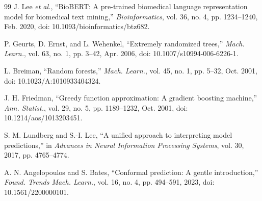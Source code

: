 \documentclass[10pt,letterpaper,twocolumn]{article}
\begin{document}
\begin{thebibliography}{99}
J. Lee \emph{et al.}, ``BioBERT: A pre-trained biomedical language representation model for biomedical text mining,'' \emph{Bioinformatics}, vol. 36, no. 4, pp. 1234--1240, Feb. 2020, doi: 10.1093/bioinformatics/btz682.

P. Geurts, D. Ernst, and L. Wehenkel, ``Extremely randomized trees,'' \emph{Mach. Learn.}, vol. 63, no. 1, pp. 3--42, Apr. 2006, doi: 10.1007/s10994-006-6226-1.

L. Breiman, ``Random forests,'' \emph{Mach. Learn.}, vol. 45, no. 1, pp. 5--32, Oct. 2001, doi: 10.1023/A:1010933404324.


J. H. Friedman, ``Greedy function approximation: A gradient boosting machine,'' \emph{Ann. Statist.}, vol. 29, no. 5, pp. 1189--1232, Oct. 2001, doi: 10.1214/aos/1013203451.

S. M. Lundberg and S.-I. Lee, ``A unified approach to interpreting model predictions,'' in \emph{Advances in Neural Information Processing Systems}, vol. 30, 2017, pp. 4765--4774.

\balance
{}
A. N. Angelopoulos and S. Bates, ``Conformal prediction: A gentle introduction,'' \emph{Found. Trends Mach. Learn.}, vol. 16, no. 4, pp. 494--591, 2023, doi: 10.1561/2200000101.


\end{thebibliography}
\end{document}
